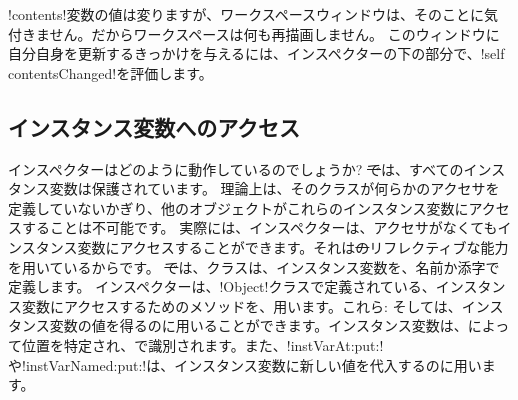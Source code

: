 \documentclass[a4paper,10pt,twoside]{book}
\begin{document}
\ct!contents!変数の値は変りますが、ワークスペースウィンドウは、そのことに気付きません。だからワークスペースは何も再描画しません。
このウィンドウに自分自身を更新するきっかけを与えるには、インスペクターの下の部分で、\ct!self contentsChanged!を評価します。

\subsection{インスタンス変数へのアクセス}

インスペクターはどのように動作しているのでしょうか?
\st では、すべてのインスタンス変数は保護されています。
理論上は、そのクラスが何らかのアクセサを定義していないかぎり、他のオブジェクトがこれらのインスタンス変数にアクセスすることは不可能です。
実際には、インスペクターは、アクセサがなくてもインスタンス変数にアクセスすることができます。それは\st のリフレクティブな能力を用いているからです。
\st では、クラスは、インスタンス変数を、名前か添字で定義します。
インスペクターは、\ct!Object!クラスで定義されている、インスタンス変数にアクセスするためのメソッドを、用います。これら: そしては、インスタンス変数の値を得るのに用いることができます。インスタンス変数は、によって位置を特定され、で識別されます。また、\ct!instVarAt:put:!や\ct!instVarNamed:put:!は、インスタンス変数に新しい値を代入するのに用います。%
\end{document}
